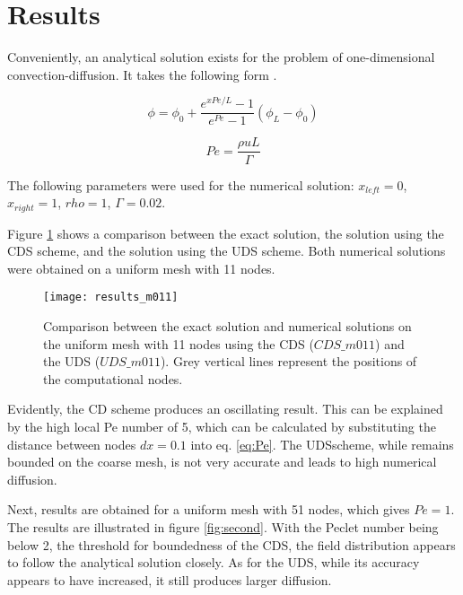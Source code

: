 \documentclass[12pt]{article}
\begin{document}
\section{Results}
\label{sec:results}

Conveniently, an analytical solution exists for the problem of one-dimensional convection-diffusion. It takes the following form \parencite{FerzigerCFD}.

\begin{equation}
    \phi = \phi_0 + \frac{e^{xPe/L} - 1}{e^{Pe} - 1} \left( \phi_L - \phi_0 \right)
    \label{eq:exactSol}
\end{equation}

\begin{equation}
    Pe = \frac{\rho u L}{\Gamma}
    \label{eq:Pe}
\end{equation}

The following parameters were used for the numerical solution: $x_{left} = 0$, $x_{right} = 1$, $rho = 1$, $\Gamma = 0.02$.

Figure \ref{fig:first} shows a comparison between the exact solution, the solution using the CDS scheme, and the solution using the UDS scheme. Both numerical solutions were obtained on a uniform mesh with 11 nodes.

\begin{figure}
    \centering
    \texttt{[image: results\_m011]}
    \caption{Comparison between the exact solution and numerical solutions on the uniform mesh with 11 nodes using the CDS ($CDS\_m011$) and the UDS ($UDS\_m011$). Grey vertical lines represent the positions of the computational nodes.}
    \label{fig:first}
\end{figure}

Evidently, the CD scheme produces an oscillating result. This can be explained by the high local Pe number of 5, which can be calculated by substituting the distance between nodes $dx = 0.1$ into eq. \eqref{eq:Pe}. The UDSscheme, while remains bounded on the coarse mesh, is not very accurate and leads to high numerical diffusion.

Next, results are obtained for a uniform mesh with 51 nodes, which gives $Pe = 1$. The results are illustrated in figure \ref{fig:second}. With the Peclet number being below 2, the threshold for boundedness of the CDS, the field distribution appears to follow the analytical solution closely. As for the UDS, while its accuracy appears to have increased, it still produces larger diffusion.
\end{document}
